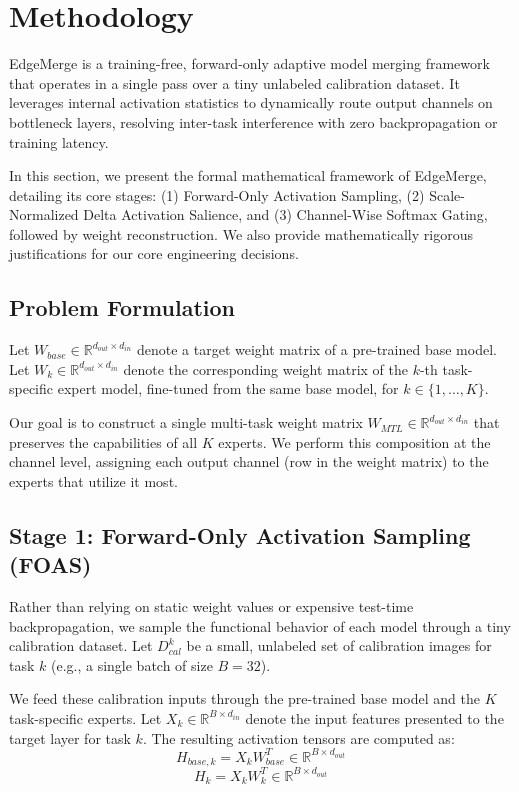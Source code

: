 \section{Methodology}
\label{sec:method}

EdgeMerge is a training-free, forward-only adaptive model merging framework that operates in a single pass over a tiny unlabeled calibration dataset. It leverages internal activation statistics to dynamically route output channels on bottleneck layers, resolving inter-task interference with zero backpropagation or training latency.

In this section, we present the formal mathematical framework of EdgeMerge, detailing its core stages: (1) Forward-Only Activation Sampling, (2) Scale-Normalized Delta Activation Salience, and (3) Channel-Wise Softmax Gating, followed by weight reconstruction. We also provide mathematically rigorous justifications for our core engineering decisions.

\subsection{Problem Formulation}
Let $W_{base} \in \mathbb{R}^{d_{out} \times d_{in}}$ denote a target weight matrix of a pre-trained base model. Let $W_k \in \mathbb{R}^{d_{out} \times d_{in}}$ denote the corresponding weight matrix of the $k$-th task-specific expert model, fine-tuned from the same base model, for $k \in \{1, \dots, K\}$.

Our goal is to construct a single multi-task weight matrix $W_{MTL} \in \mathbb{R}^{d_{out} \times d_{in}}$ that preserves the capabilities of all $K$ experts. We perform this composition at the channel level, assigning each output channel (row in the weight matrix) to the experts that utilize it most.

\subsection{Stage 1: Forward-Only Activation Sampling (FOAS)}
Rather than relying on static weight values or expensive test-time backpropagation, we sample the functional behavior of each model through a tiny calibration dataset. Let $D_{cal}^k$ be a small, unlabeled set of calibration images for task $k$ (e.g., a single batch of size $B = 32$).

We feed these calibration inputs through the pre-trained base model and the $K$ task-specific experts. Let $X_k \in \mathbb{R}^{B \times d_{in}}$ denote the input features presented to the target layer for task $k$. The resulting activation tensors are computed as:
\begin{equation}
H_{base, k} = X_k W_{base}^T \in \mathbb{R}^{B \times d_{out}}
\end{equation}
\begin{equation}
H_{k} = X_k W_k^T \in \mathbb{R}^{B \times d_{out}}
\end{equation}

